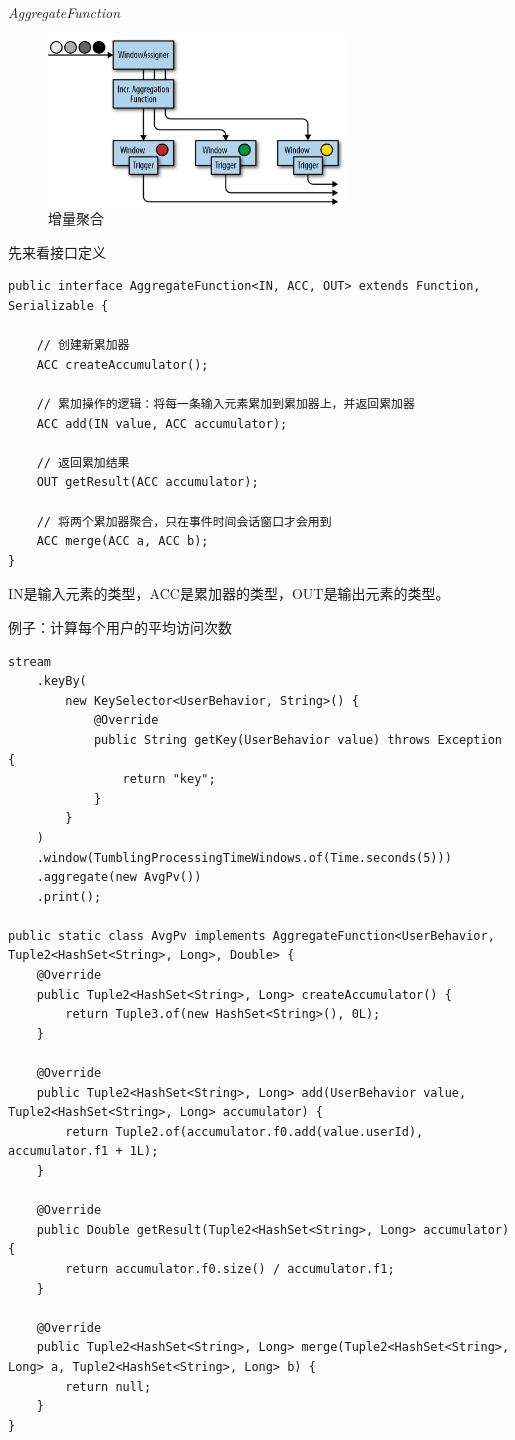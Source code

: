 \documentclass[cn,11pt,chinese]{elegantbook}
\begin{document}
\textit{AggregateFunction}

\begin{figure}[htbp]
    \centering
    \includegraphics[width=0.7\textwidth]{images/spaf_0604.png}
    \caption{增量聚合}
\end{figure}

先来看接口定义

\begin{verbatim}
public interface AggregateFunction<IN, ACC, OUT> extends Function, Serializable {
    
    // 创建新累加器
    ACC createAccumulator();
    
    // 累加操作的逻辑：将每一条输入元素累加到累加器上，并返回累加器
    ACC add(IN value, ACC accumulator);
    
    // 返回累加结果
    OUT getResult(ACC accumulator);
    
    // 将两个累加器聚合，只在事件时间会话窗口才会用到
    ACC merge(ACC a, ACC b);
}
\end{verbatim}

IN是输入元素的类型，ACC是累加器的类型，OUT是输出元素的类型。

例子：计算每个用户的平均访问次数

\begin{verbatim}
stream
    .keyBy(
        new KeySelector<UserBehavior, String>() {
            @Override
            public String getKey(UserBehavior value) throws Exception {
                return "key";
            }
        }
    )
    .window(TumblingProcessingTimeWindows.of(Time.seconds(5)))
    .aggregate(new AvgPv())
    .print();

public static class AvgPv implements AggregateFunction<UserBehavior, Tuple2<HashSet<String>, Long>, Double> {
    @Override
    public Tuple2<HashSet<String>, Long> createAccumulator() {
        return Tuple3.of(new HashSet<String>(), 0L);
    }
    
    @Override
    public Tuple2<HashSet<String>, Long> add(UserBehavior value, Tuple2<HashSet<String>, Long> accumulator) {
        return Tuple2.of(accumulator.f0.add(value.userId), accumulator.f1 + 1L);
    }
    
    @Override
    public Double getResult(Tuple2<HashSet<String>, Long> accumulator) {
        return accumulator.f0.size() / accumulator.f1;
    }
    
    @Override
    public Tuple2<HashSet<String>, Long> merge(Tuple2<HashSet<String>, Long> a, Tuple2<HashSet<String>, Long> b) {
        return null;
    }
}
\end{verbatim}
\end{document}
